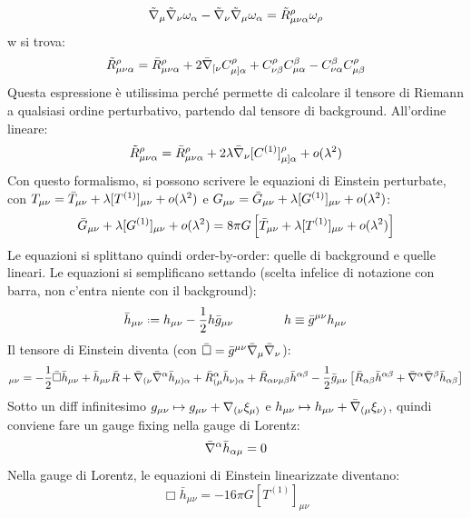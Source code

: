 \begin{equation*}
  \tilde{\nabla}_\mu \tilde{\nabla}_\nu \omega_\alpha - \tilde{\nabla}_\nu \tilde{\nabla}_\mu \omega_\alpha = \tilde{R}_{\mu \nu \alpha}^\rho \omega_\rho
\end{equation*}
w si trova:
\begin{equation}
  \tilde{R}_{\mu \nu \alpha}^\rho = \bar{R}_{\mu \nu \alpha}^\rho + 2 \bar{\nabla}_{[\nu} C_{\mu]\alpha}^\rho + C_{\nu \beta}^\rho C_{\mu \alpha}^\beta - C_{\nu \alpha}^\beta C_{\mu \beta}^\rho
\end{equation}
Questa espressione è utilissima perché permette di calcolare il tensore di Riemann a qualsiasi ordine perturbativo, partendo dal tensore di background. All'ordine lineare:
\begin{equation*}
  \tilde{R}_{\mu \nu \alpha}^\rho = \bar{R}_{\mu \nu \alpha}^\rho + 2 \lambda \bar{\nabla}_\nu [C^{(1)}]_{\mu] \alpha}^\rho + o(\lambda^2)
\end{equation*}
Con questo formalismo, si possono scrivere le equazioni di Einstein perturbate, con $ T_{\mu \nu} = \bar{T}_{\mu \nu} + \lambda [T^{(1)}]_{\mu \nu} + o(\lambda^2) $ e $ G_{\mu \nu} = \bar{G}_{\mu \nu} + \lambda [G^{(1)}]_{\mu \nu} + o(\lambda^2) $:
\begin{equation*}
  \bar{G}_{\mu \nu} + \lambda [G^{(1)}]_{\mu \nu} + o(\lambda^2) = 8 \pi G \left[ \bar{T}_{\mu \nu} + \lambda [T^{(1)}]_{\mu \nu} + o(\lambda^2) \right]
\end{equation*}
Le equazioni si splittano quindi order-by-order: quelle di background e quelle lineari. Le equazioni si semplificano settando (scelta infelice di notazione con barra, non c'entra niente con il background):
\begin{equation}
  \bar{h}_{\mu \nu} \defeq h_{\mu \nu} - \frac{1}{2} h \bar{g}_{\mu \nu}
  \qquad \qquad
  h \equiv \bar{g}^{\mu \nu} h_{\mu \nu}
\end{equation}
Il tensore di Einstein diventa (con $ \bar{\Box} = \bar{g}^{\mu \nu} \bar{\nabla}_\mu \bar{\nabla}_\nu $):
\begin{equation*}
  [G^{(1)}]_{\mu \nu} = - \frac{1}{2} \bar{\Box} \bar{h}_{\mu \nu} + \bar{h}_{\mu \nu} \bar{R} + \bar{\na}_{(\nu} \bar{\na}^\alpha \bar{h}_{\mu)\alpha} + \bar{R}_{(\mu}^\alpha \bar{h}_{\nu)\alpha} + \bar{R}_{\alpha \nu \mu \beta} \bar{h}^{\alpha \beta} - \frac{1}{2} \bar{g}_{\mu \nu} \left[ \bar{R}_{\alpha \beta} \bar{h}^{\alpha \beta} + \bar{\na}^\alpha \bar{\na}^\beta \bar{h}_{\alpha \beta} \right]
\end{equation*}
Sotto un diff infinitesimo $ g_{\mu \nu} \mapsto g_{\mu \nu} + \nabla_{(\nu} \xi_{\mu)} $ e $ h_{\mu \nu} \mapsto h_{\mu \nu} + \bar{\nabla}_{(\mu} \xi_{\nu)} $, quindi conviene fare un gauge fixing nella gauge di Lorentz:
\begin{equation}
  \bar{\nabla}^\alpha \bar{h}_{\alpha \mu} = 0
\end{equation}
Nella gauge di Lorentz, le equazioni di Einstein linearizzate diventano:
\begin{equation}
  \Box \bar{h}_{\mu \nu} = - 16 \pi G [T^{(1)}]_{\mu \nu}
\end{equation}

